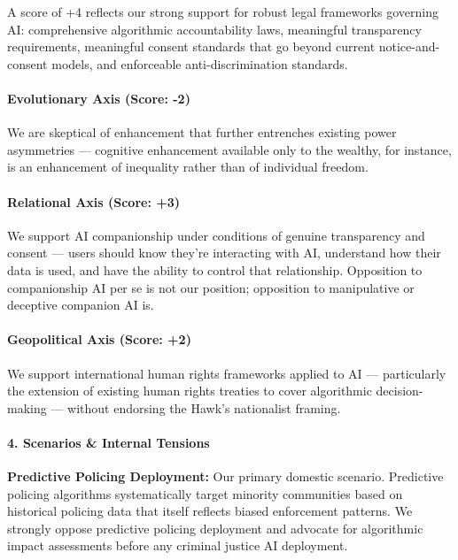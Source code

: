 A score of +4 reflects our strong support for robust legal frameworks
governing AI: comprehensive algorithmic accountability laws, meaningful
transparency requirements, meaningful consent standards that go beyond
current notice-and-consent models, and enforceable anti-discrimination
standards.

\paragraph{Evolutionary Axis (Score:
-2)}\label{evolutionary-axis-score--2-4}

We are skeptical of enhancement that further entrenches existing power
asymmetries --- cognitive enhancement available only to the wealthy, for
instance, is an enhancement of inequality rather than of individual
freedom.

\paragraph{Relational Axis (Score: +3)}\label{relational-axis-score-3}

We support AI companionship under conditions of genuine transparency and
consent --- users should know they're interacting with AI, understand
how their data is used, and have the ability to control that
relationship. Opposition to companionship AI per se is not our position;
opposition to manipulative or deceptive companion AI is.

\paragraph{Geopolitical Axis (Score:
+2)}\label{geopolitical-axis-score-2-6}

We support international human rights frameworks applied to AI ---
particularly the extension of existing human rights treaties to cover
algorithmic decision-making --- without endorsing the Hawk's nationalist
framing.

\paragraph{4. Scenarios \& Internal
Tensions}\label{scenarios-internal-tensions-34}

\textbf{Predictive Policing Deployment:} Our primary domestic scenario.
Predictive policing algorithms systematically target minority
communities based on historical policing data that itself reflects
biased enforcement patterns. We strongly oppose predictive policing
deployment and advocate for algorithmic impact assessments before any
criminal justice AI deployment.

